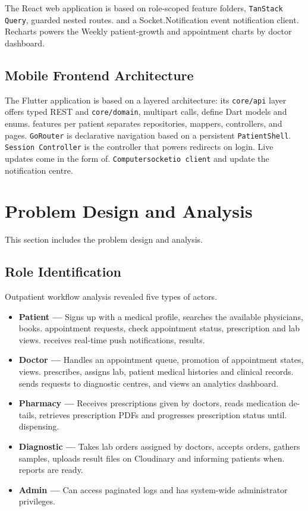 \documentclass[12pt,a4paper]{report}
\begin{document}
The React web application is based on role-scoped feature folders, \texttt{TanStack Query}, guarded nested routes.
and a Socket.Notification event notification client. Recharts powers the
Weekly patient-growth and appointment charts by doctor dashboard.

\subsection{Mobile Frontend Architecture}

The Flutter application is based on a layered architecture: its \texttt{core/api} layer offers typed REST and
\texttt{core/domain}, multipart calls, define Dart models and enums.
features per patient separates repositories, mappers, controllers, and pages.
\texttt{GoRouter} is declarative navigation based on a persistent \texttt{PatientShell}.
\texttt{Session Controller} is the controller that powers redirects on login. Live updates come in the form of.
\texttt{Computersocketio client} and update the notification centre.

\section{Problem Design and Analysis}

This section includes the problem design and analysis.

\subsection{Role Identification}

Outpatient workflow analysis revealed five types of actors.

\begin{itemize}[leftmargin=0.7in]
  \item \textbf{Patient ---} Signs up with a medical profile, searches the available physicians, books.
        appointment requests, check appointment status, prescription and lab views.
        receives real-time push notifications, results.
  \item \textbf{Doctor ---} Handles an appointment queue, promotion of appointment states, views.
        prescribes, assigns lab, patient medical histories and clinical records.
        sends requests to diagnostic centres, and views an analytics dashboard.
  \item \textbf{Pharmacy ---} Receives prescriptions given by doctors, reads medication de-
        tails, retrieves prescription PDFs and progresses prescription status until.
        dispensing.
  \item \textbf{Diagnostic ---} Takes lab orders assigned by doctors, accepts orders,
        gathers samples, uploads result files on Cloudinary and informing patients when.
        reports are ready.
  \item \textbf{Admin ---} Can access paginated logs and has system-wide administrator privileges.
\end{itemize}
\end{document}
